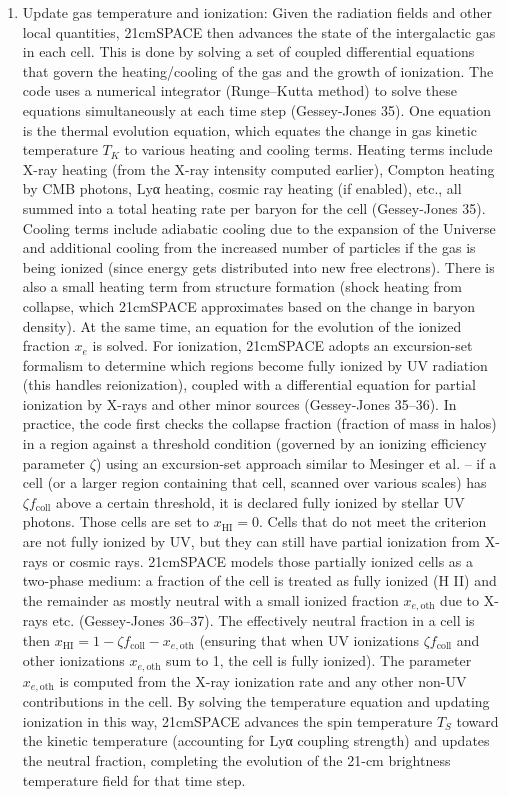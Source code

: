 \documentclass[floats,floatfix,showpacs,amssymb,prd,superscriptaddress,nofootinbib]{revtex4-2} %
\begin{document}
\begin{enumerate}
    \item Update gas temperature and ionization: Given the radiation fields and other local quantities, 21cmSPACE then advances the state of the intergalactic gas in each cell. This is done by solving a set of coupled differential equations that govern the heating/cooling of the gas and the growth of ionization. The code uses a numerical integrator (Runge–Kutta method) to solve these equations simultaneously at each time step (Gessey-Jones 35). One equation is the thermal evolution equation, which equates the change in gas kinetic temperature $T_K$ to various heating and cooling terms. Heating terms include X-ray heating (from the X-ray intensity computed earlier), Compton heating by CMB photons, Lyα heating, cosmic ray heating (if enabled), etc., all summed into a total heating rate per baryon for the cell (Gessey-Jones 35). Cooling terms include adiabatic cooling due to the expansion of the Universe and additional cooling from the increased number of particles if the gas is being ionized (since energy gets distributed into new free electrons). There is also a small heating term from structure formation (shock heating from collapse, which 21cmSPACE approximates based on the change in baryon density). At the same time, an equation for the evolution of the ionized fraction $x_e$ is solved. For ionization, 21cmSPACE adopts an excursion-set formalism to determine which regions become fully ionized by UV radiation (this handles reionization), coupled with a differential equation for partial ionization by X-rays and other minor sources (Gessey-Jones 35–36). In practice, the code first checks the collapse fraction (fraction of mass in halos) in a region against a threshold condition (governed by an ionizing efficiency parameter $\zeta$) using an excursion-set approach similar to Mesinger et al. – if a cell (or a larger region containing that cell, scanned over various scales) has $\zeta f_{\text{coll}}$ above a certain threshold, it is declared fully ionized by stellar UV photons. Those cells are set to $x_{\mathrm{HI}} = 0$. Cells that do not meet the criterion are not fully ionized by UV, but they can still have partial ionization from X-rays or cosmic rays. 21cmSPACE models those partially ionized cells as a two-phase medium: a fraction of the cell is treated as fully ionized (H II) and the remainder as mostly neutral with a small ionized fraction $x_{e,\text{oth}}$ due to X-rays etc. (Gessey-Jones 36–37). The effectively neutral fraction in a cell is then $x_{\mathrm{HI}} = 1 - \zeta f_{\text{coll}} - x_{e,\text{oth}}$ (ensuring that when UV ionizations $\zeta f_{\text{coll}}$ and other ionizations $x_{e,\text{oth}}$ sum to 1, the cell is fully ionized). The parameter $x_{e,\text{oth}}$ is computed from the X-ray ionization rate and any other non-UV contributions in the cell. By solving the temperature equation and updating ionization in this way, 21cmSPACE advances the spin temperature $T_S$ toward the kinetic temperature (accounting for Lyα coupling strength) and updates the neutral fraction, completing the evolution of the 21-cm brightness temperature field for that time step.


\end{enumerate}
\end{document}
